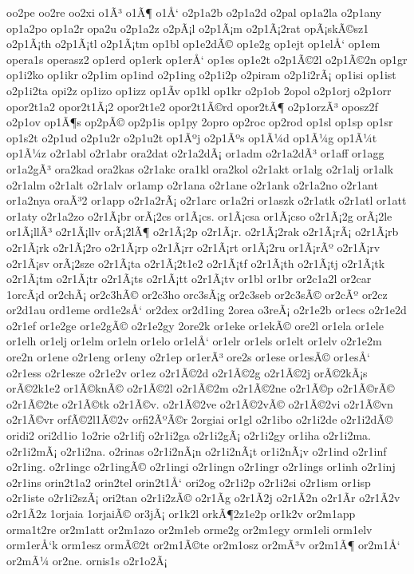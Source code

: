 {oo2pe
oo2re
oo2xi
o1Ã³
o1Ã¶
o1Å‘
o2p1a2b
o2p1a2d
o2pal
op1a2la
o2p1any
op1a2po
op1a2r
opa2u
o2p1a2z
o2pÃ¡l
o2p1Ã¡m
o2p1Ã¡2rat
opÃ¡skÃ©sz1
o2p1Ã¡th
o2p1Ã¡tl
o2p1Ã¡tm
op1bl
op1e2dÃ©
op1e2g
op1ejt
op1elÅ‘
op1em
opera1s
operasz2
op1erd
op1erk
op1erÅ‘
op1es
op1e2t
o2p1Ã©2l
o2p1Ã©2n
op1gr
op1i2ko
op1ikr
o2p1im
op1ind
o2p1ing
o2p1i2p
o2piram
o2p1i2rÃ¡
op1isi
op1ist
o2p1i2ta
opi2z
op1izo
op1izz
op1Ã­v
op1kl
op1kr
o2p1ob
2opol
o2p1orj
o2p1orr
opor2t1a2
opor2t1Ã¡2
opor2t1e2
opor2t1Ã©rd
opor2tÃ¶
o2p1orzÃ³
oposz2f
o2p1ov
op1Ã¶s
op2pÃ©
op2p1is
op1py
2opro
op2roc
op2rod
op1sl
op1sp
op1sr
op1s2t
o2p1ud
o2p1u2r
o2p1u2t
op1Ãºj
o2p1Ãºs
op1Ã¼d
op1Ã¼g
op1Ã¼t
op1Ã¼z
o2r1abl
o2r1abr
ora2dat
o2r1a2dÃ¡
or1adm
o2r1a2dÃ³
or1aff
or1agg
or1a2gÃ³
ora2kad
ora2kas
o2r1akc
ora1kl
ora2kol
o2r1akt
or1alg
o2r1alj
or1alk
o2r1alm
o2r1alt
o2r1alv
or1amp
o2r1ana
o2r1ane
o2r1ank
o2r1a2no
o2r1ant
or1a2nya
oraÃ³2
or1app
o2r1a2rÃ¡
o2r1arc
or1a2ri
or1aszk
o2r1atk
o2r1atl
or1att
or1aty
o2r1a2zo
o2r1Ã¡br
orÃ¡2cs
or1Ã¡cs.
or1Ã¡csa
or1Ã¡cso
o2r1Ã¡2g
orÃ¡2le
or1Ã¡llÃ³
o2r1Ã¡llv
orÃ¡2lÃ¶
o2r1Ã¡2p
o2r1Ã¡r.
o2r1Ã¡2rak
o2r1Ã¡rÃ¡
o2r1Ã¡rb
o2r1Ã¡rk
o2r1Ã¡2ro
o2r1Ã¡rp
o2r1Ã¡rr
o2r1Ã¡rt
or1Ã¡2ru
or1Ã¡rÃº
o2r1Ã¡rv
o2r1Ã¡sv
orÃ¡2sze
o2r1Ã¡ta
o2r1Ã¡2t1e2
o2r1Ã¡tf
o2r1Ã¡th
o2r1Ã¡tj
o2r1Ã¡tk
o2r1Ã¡tm
o2r1Ã¡tr
o2r1Ã¡ts
o2r1Ã¡tt
o2r1Ã¡tv
or1bl
or1br
or2c1a2l
or2car
1orcÃ¡d
or2chÃ¡
or2c3hÃ©
or2c3ho
orc3sÃ¡g
or2c3seb
or2c3sÃ©
or2cÃº
or2cz
or2d1au
ord1eme
ord1e2sÅ‘
or2dex
or2d1ing
2orea
o3reÃ¡
o2r1e2b
or1ecs
o2r1e2d
o2r1ef
or1e2ge
or1e2gÃ©
o2r1e2gy
2ore2k
or1eke
or1ekÃ©
ore2l
or1ela
or1ele
or1elh
or1elj
or1elm
or1eln
or1elo
or1elÅ‘
or1elr
or1els
or1elt
or1elv
o2r1e2m
ore2n
or1ene
o2r1eng
or1eny
o2r1ep
or1erÃ³
ore2s
or1ese
or1esÃ©
or1esÅ‘
o2r1ess
o2r1esze
o2r1e2v
or1ez
o2r1Ã©2d
o2r1Ã©2g
o2r1Ã©2j
orÃ©2kÃ¡s
orÃ©2k1e2
or1Ã©knÃ©
o2r1Ã©2l
o2r1Ã©2m
o2r1Ã©2ne
o2r1Ã©p
o2r1Ã©rÃ©
o2r1Ã©2te
o2r1Ã©tk
o2r1Ã©v.
o2r1Ã©2ve
o2r1Ã©2vÃ©
o2r1Ã©2vi
o2r1Ã©vn
o2r1Ã©vr
orfÃ©2l1Ã©2v
orfi2ÃºÃ©r
2orgiai
or1gl
o2r1ibo
o2r1i2de
o2r1i2dÃ©
oridi2
ori2d1io
1o2rie
o2r1ifj
o2r1i2ga
o2r1i2gÃ¡
o2r1i2gy
or1iha
o2r1i2ma.
o2r1i2mÃ¡
o2r1i2na.
o2rinas
o2r1i2nÃ¡n
o2r1i2nÃ¡t
or1i2nÃ¡v
o2r1ind
o2r1inf
o2r1ing.
o2r1ingc
o2r1ingÃ©
o2r1ingi
o2r1ingn
o2r1ingr
o2r1ings
or1inh
o2r1inj
o2r1ins
orin2t1a2
orin2tel
orin2t1Å‘
ori2og
o2r1i2p
o2r1i2si
o2r1ism
or1isp
o2r1iste
o2r1i2szÃ¡
ori2tan
o2r1i2zÃ©
o2r1Ã­g
o2r1Ã­2j
o2r1Ã­2n
o2r1Ã­r
o2r1Ã­2v
o2r1Ã­2z
1orjaia
1orjaiÃ©
or3jÃ¡
or1k2l
orkÃ¶2z1e2p
or1k2v
or2m1app
orma1t2re
or2m1att
or2m1azo
or2m1eb
orme2g
or2m1egy
orm1eli
orm1elv
orm1erÅ‘k
orm1esz
ormÃ©2t
or2m1Ã©te
or2m1osz
or2mÃ³v
or2m1Ã¶
or2m1Å‘
or2mÃ¼
or2ne.
ornis1s
o2r1o2Ã¡
}
